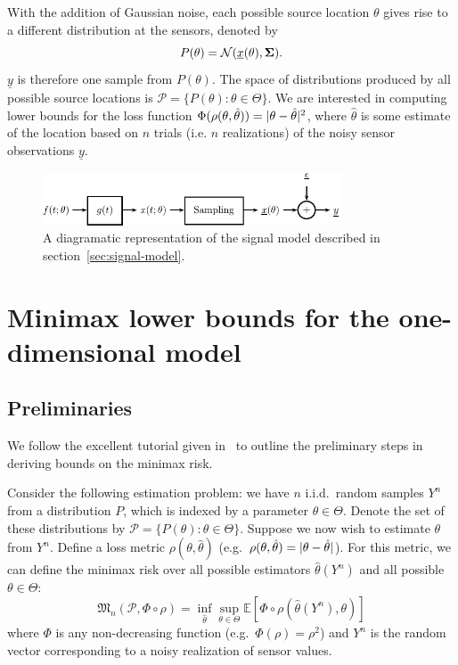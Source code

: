 \documentclass[conference]{IEEEtran}
\providecommand{\v}{}
\renewcommand{\v}[1]{\underline{#1}}
\providecommand{\m}{}
\renewcommand{\m}[1]{{\bf #1}}
\DeclarePairedDelimiter\abs{\lvert}{\rvert}
\newcommand{\Phiorho}{\Phi\!\circ\!\rho}
\begin{document}
With the addition of Gaussian noise, each possible source location $\theta$
gives rise to a different distribution at the sensors, denoted by
\begin{equation} \label{eq:p-theta}
	P(\theta) = \mathcal{N}(\v x(\theta), \m \Sigma).
\end{equation}
$\v y$ is therefore one sample from $P(\theta)$. The space of distributions
produced by all possible source locations is $\mathcal{P} = \{P(\theta) :
\theta \in \Theta \}$. We are interested in computing lower bounds for the loss
function $\Phi(\rho(\theta, \hat\theta)) = \abs{\theta - \hat\theta}^2$, where
$\hat\theta$ is some estimate of the location based on $n$ trials (i.e. $n$
realizations) of the noisy sensor observations $\v y$.

\begin{figure}[tp] %
	\centering
	\includegraphics[width=3.5in]{block-diagram}
	\caption{A diagramatic representation of the signal model described in
	section~\ref{sec:signal-model}.}
	\label{fig:signal-model}
\end{figure}

\section{Minimax lower bounds for the one-dimensional model}

\subsection{Preliminaries}

We follow the excellent tutorial given in~\cite{Duchi2015Information} to
outline the preliminary steps in deriving bounds on the minimax risk.

Consider the following estimation problem: we have $n$ i.i.d.\ random samples
$Y^n$ from a distribution $P$, which is indexed by a parameter $\theta \in
\Theta$.  Denote the set of these distributions by $\mathcal{P} = \{P(\theta) :
\theta \in \Theta\}$. Suppose we now wish to estimate $\theta$ from $Y^n$.
Define a loss metric $\rho(\theta, \hat\theta)$ (e.g.\ $\rho(\theta,
\hat\theta) = \abs{\theta - \hat\theta}$). For this metric, we can define the
minimax risk over all possible estimators $\hat\theta(Y^n)$ and all possible
$\theta \in \Theta$:
\begin{equation} \label{eq:minimax-expr}
	\mathfrak{M}_n(\mathcal{P}, \Phiorho) = \inf_{\hat\theta} \sup_{\theta \in \Theta} \mathbb E[\Phiorho (\hat\theta(Y^n), \theta)]
\end{equation}
where $\Phi$ is any non-decreasing function (e.g.\ $\Phi(\rho) = \rho^2$) and
$Y^n$ is the random vector corresponding to a noisy realization of sensor
values.
\end{document}
